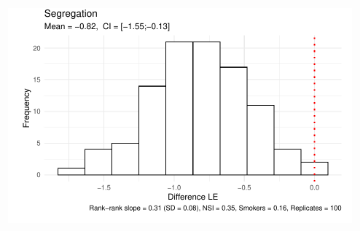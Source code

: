 \begin{figure}[htp]
     \begin{subfigure}[b]{0.60\textwidth}
         \centering
         \includegraphics[width=\textwidth]{plots/microsimulation-transmob/microsimulation_transmob_3.pdf}
     \end{subfigure} %
\end{figure}
